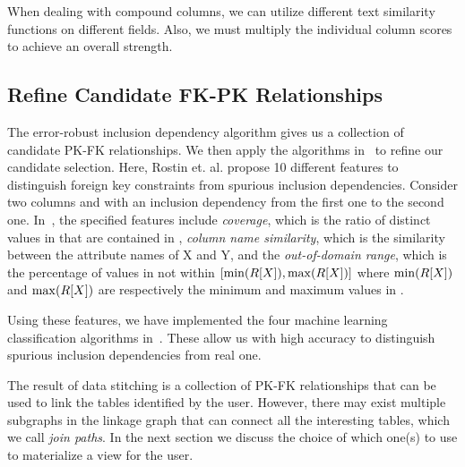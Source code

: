 When dealing with compound columns, we can utilize different text similarity functions on different fields. Also, we must multiply the individual column scores to achieve an overall strength.


\subsection{Refine Candidate FK-PK Relationships}\label{subsec:refine}


The error-robust inclusion dependency algorithm gives us a collection of candidate PK-FK relationships. We then apply the algorithms in~\cite{DBLP:conf/webdb/RostinABNL09} to refine our candidate selection. Here, Rostin et. al. propose 10 different features to distinguish foreign key constraints from spurious inclusion dependencies. Consider two columns \RX and \SY with an inclusion dependency from the first one to the second one. In~\cite{DBLP:conf/webdb/RostinABNL09}, the specified features include \emph{coverage}, which is the ratio of distinct values in \RX that are contained in \SY, \emph{column name similarity}, which is the similarity between the attribute names of X and Y, and the \emph{out-of-domain range}, which is the percentage of values in \SY not within $[\min(R[X]), \max(R[X])]$ where $\min(R[X])$ and $\max(R[X])$ are respectively the minimum and maximum values in \RX. 

Using these features, we have implemented the four machine learning classification algorithms in~\cite{DBLP:conf/webdb/RostinABNL09}. These allow us with high accuracy to distinguish spurious inclusion dependencies from real one.

The result of data stitching is a collection of PK-FK relationships that can be used to link the tables identified by the user. However, there may exist multiple subgraphs in the linkage graph that can connect all the interesting tables, which we call \emph{join paths}. In the next section we discuss the choice of which one(s) to use to materialize a view for the user.


